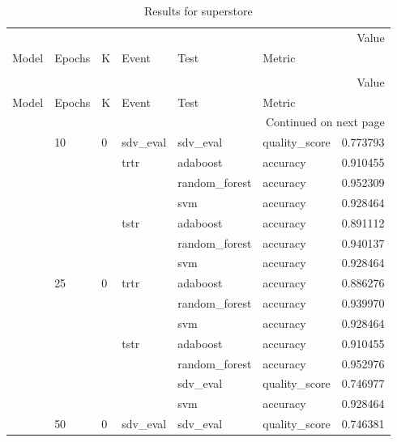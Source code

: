 \begin{longtable}{llllllr}
\caption{Results for superstore} \\
\toprule
 &  &  &  &  &  & Value \\
Model & Epochs & K & Event & Test & Metric &  \\
\midrule
\endfirsthead
\caption[]{Results for superstore} \\
\toprule
 &  &  &  &  &  & Value \\
Model & Epochs & K & Event & Test & Metric &  \\
\midrule
\endhead
\midrule
\multicolumn{7}{r}{Continued on next page} \\
\midrule
\endfoot
\bottomrule
\endlastfoot
\multirow[t]{35}{*}{CTGAN} & \multirow[t]{7}{*}{10} & \multirow[t]{7}{*}{0} & sdv_eval & sdv_eval & quality_score & 0.773793 \\
\cline{4-7} \cline{5-7}
 &  &  & \multirow[t]{3}{*}{trtr} & adaboost & accuracy & 0.910455 \\
\cline{5-7}
 &  &  &  & random_forest & accuracy & 0.952309 \\
\cline{5-7}
 &  &  &  & svm & accuracy & 0.928464 \\
\cline{4-7} \cline{5-7}
 &  &  & \multirow[t]{3}{*}{tstr} & adaboost & accuracy & 0.891112 \\
\cline{5-7}
 &  &  &  & random_forest & accuracy & 0.940137 \\
\cline{5-7}
 &  &  &  & svm & accuracy & 0.928464 \\
\cline{2-7} \cline{3-7} \cline{4-7} \cline{5-7}
 & \multirow[t]{7}{*}{25} & \multirow[t]{7}{*}{0} & \multirow[t]{3}{*}{trtr} & adaboost & accuracy & 0.886276 \\
\cline{5-7}
 &  &  &  & random_forest & accuracy & 0.939970 \\
\cline{5-7}
 &  &  &  & svm & accuracy & 0.928464 \\
\cline{4-7} \cline{5-7}
 &  &  & \multirow[t]{4}{*}{tstr} & adaboost & accuracy & 0.910455 \\
\cline{5-7}
 &  &  &  & random_forest & accuracy & 0.952976 \\
\cline{5-7}
 &  &  &  & sdv_eval & quality_score & 0.746977 \\
\cline{5-7}
 &  &  &  & svm & accuracy & 0.928464 \\
\cline{2-7} \cline{3-7} \cline{4-7} \cline{5-7}
 & \multirow[t]{7}{*}{50} & \multirow[t]{7}{*}{0} & sdv_eval & sdv_eval & quality_score & 0.746381 \\
\cline{4-7} \cline{5-7}

\end{longtable}
